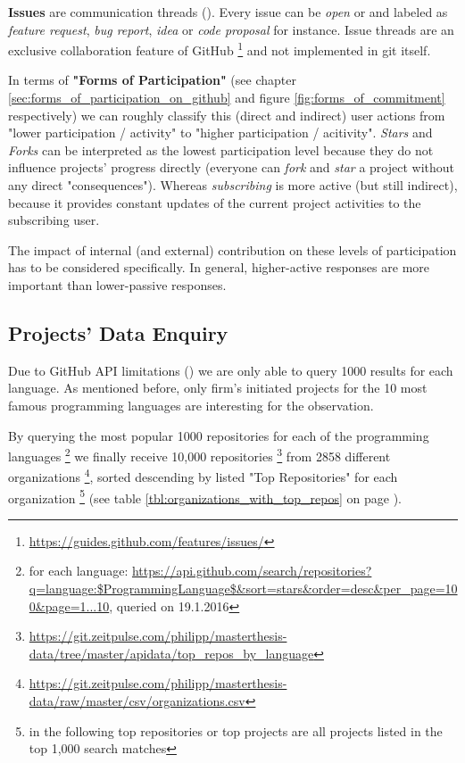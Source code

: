 \textbf{Issues} are communication threads (\cite{GitHubIssues}). Every issue can be \textit{open} or  and labeled as \textit{feature request}, \textit{bug report}, \textit{idea} or \textit{code proposal} for instance. Issue threads are an exclusive collaboration feature of GitHub \footnote{\url{https://guides.github.com/features/issues/}} and not implemented in git itself.

In terms of \textbf{"Forms of Participation"} (see chapter \ref{sec:forms_of_participation_on_github} and figure \ref{fig:forms_of_commitment} respectively) we can roughly classify this (direct and indirect) user actions from "lower participation / activity" to "higher participation / acitivity". \textit{Stars} and \textit{Forks} can be interpreted as the lowest participation level because they do not influence projects' progress directly (everyone can \textit{fork} and \textit{star} a project without any direct "consequences"). Whereas \textit{subscribing} is more active (but still indirect), because it provides constant updates of the current project activities to the subscribing user.

The impact of internal (and external) contribution on these levels of participation has to be considered specifically. In general, higher-active responses are more important than lower-passive responses.

\clearpage
\subsection{Projects' Data Enquiry}

Due to GitHub API limitations (\cite{GitHubApiLimit}) we are only able to query 1000 results for each language. As mentioned before, only firm's initiated projects for the 10 most famous programming languages are interesting for the observation.

By querying the most popular 1000 repositories for each of the programming languages \footnote{for each language:  \url{https://api.github.com/search/repositories?q=language:$ProgrammingLanguage$&sort=stars&order=desc&per_page=100&page=1...10}, queried on 19.1.2016} we finally receive 10,000 repositories \footnote{\url{https://git.zeitpulse.com/philipp/masterthesis-data/tree/master/apidata/top_repos_by_language}} from 2858 different organizations \footnote{\url{https://git.zeitpulse.com/philipp/masterthesis-data/raw/master/csv/organizations.csv}}, sorted descending by listed "Top Repositories" for each organization \footnote{in the following top repositories or top projects are all projects listed in the top 1,000 search matches} (see table \ref{tbl:organizations_with_top_repos} on page \pageref{tbl:organizations_with_top_repos}).

